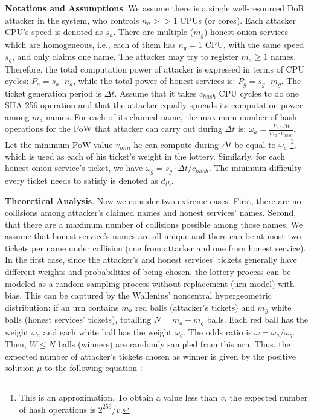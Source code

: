 \documentclass[USenglish,oneside,twocolumn]{article}
\begin{document}
\textbf{Notations and Assumptions}.
We assume there is a single well-resourced DoR attacker in the system, who controls $n_a>>1$ CPUs (or cores).  Each attacker CPU's speed is denoted as $s_a$. There are multiple ($m_g$) honest onion services which are homogeneous, i.e., each of them has $n_g=1$ CPU, with the same speed $s_g$, and only claims one name. The attacker may try to register $m_a\geq 1$ names.  Therefore, the total computation power of attacker is expressed in terms of CPU cycles: $P_a = s_a \cdot n_a$, while the total power of honest services is: $P_g=s_g \cdot m_g$. The ticket generation period is $\Delta t$. Assume that it takes $c_{\mathit{hash}}$ CPU cycles to do one SHA-256 operation and that the attacker equally spreads its computation power among $m_a$ names. For each of its claimed name, the maximum number of hash operations for the PoW that attacker can carry out during $\Delta t$ is: $\omega_a = \frac{P_a\cdot\Delta t}{m_a\cdot c_{\mathit{hash}}}$. Let the minimum PoW value $v_{\mathit{min}}$ he can compute during $\Delta t$ be equal to $\omega_a$ \footnote{This is an approximation. To obtain a value less than $v$, the expected number of hash operations is $2^{\mathit{256}}/v$.}, which is used as each of his ticket's weight  in the lottery. Similarly, for each honest onion service's ticket, we have $\omega_g = s_g\cdot\Delta t/c_{\mathit{hash}}$. The minimum difficulty every ticket needs to satisfy is denoted as $d_{\mathit{th}}$.

\textbf{Theoretical Analysis}.
Now we consider two extreme cases. First, there are no collisions among attacker's claimed names and honest services' names. Second, that there are a maximum number of collisions possible among those names. We assume that honest service's names are all unique and there can be at most two tickets per name under collision (one from attacker and one from honest service). In the first case, since the attacker's and honest services' tickets generally have different weights and probabilities of being chosen, the lottery process can be modeled as a random sampling process without replacement (urn model) with bias. This can be captured by the Wallenius' noncentral hypergeometric distribution: if an urn contains $m_a$ red balls (attacker's tickets) and $m_g$ white balls (honest services' tickets), totalling $N = m_a + m_g$ balls. Each red ball has the weight $\omega_a$ and each white ball has the weight $\omega_g$. The odds ratio is $\omega = \omega_a / \omega_g$. Then, $W\leq N$ balls (winners) are randomly sampled from this urn. Thus, the expected number of attacker's tickets chosen as winner is given by the positive solution $\mu$ to the following equation \cite{Wallenius}:
\end{document}
